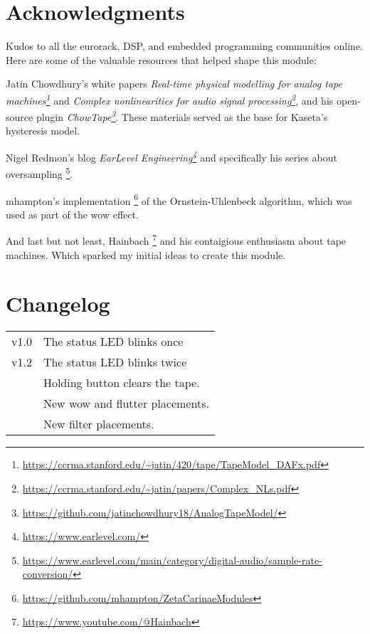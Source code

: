 \documentclass[11pt]{article}
\begin{document}
\newpage

\noindent
\begin{minipage}[t]{0.3\textwidth}
\setlength{\parskip}{6pt}
\section{Acknowledgments}

Kudos to all the eurorack, DSP, and embedded programming communities online.
Here are some of the valuable resources that helped shape this module:

Jatin Chowdhury's white papers
\textit{Real-time physical modelling for analog tape machines\footnote{
  \url{https://ccrma.stanford.edu/~jatin/420/tape/TapeModel_DAFx.pdf}
}}
and
\textit{Complex nonlinearities for audio signal processing\footnote{
  \url{https://ccrma.stanford.edu/~jatin/papers/Complex_NLs.pdf}
}},
and his open-source plugin
\textit{ChowTape\footnote{
  \url{https://github.com/jatinchowdhury18/AnalogTapeModel/}
}}. These materials served as the base for Kaseta's hysteresis model.

Nigel Redmon's blog
\textit{EarLevel Engineering\footnote{
  \url{https://www.earlevel.com/}
}}
and specifically his series about oversampling%
\footnote{\url{https://www.earlevel.com/main/category/digital-audio/sample-rate-conversion/}}.

mhampton's implementation%
\footnote{\url{https://github.com/mhampton/ZetaCarinaeModules}}
of the Ornstein-Uhlenbeck algorithm, which was used as part of the wow effect.

And last but not least, Hainbach%
\footnote{\url{https://www.youtube.com/@Hainbach}}
and his contaigious enthusiasm about tape machines. Which sparked my initial
ideas to create this module.

\vspace{2.5cm}

\end{minipage}%
\begin{minipage}{0.05\textwidth}
\phantom{ }
\end{minipage}%
\begin{minipage}[t]{0.3\textwidth}
\section{Changelog}

\begin{tabular}{@{}rl@{}}
  v1.0 & The status LED blinks once \\
  v1.2 & The status LED blinks twice \\
   & Holding button clears the tape. \\
   & New wow and flutter placements. \\
   & New filter placements.
\end{tabular}

\end{minipage}
\end{document}
